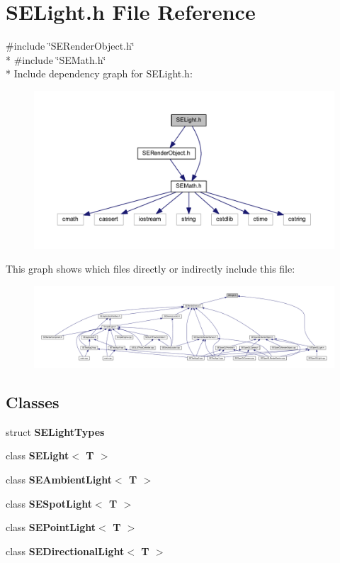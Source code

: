 \section{S\+E\+Light.\+h File Reference}
\label{_s_e_light_8h}
{\ttfamily \#include \char`\"{}S\+E\+Render\+Object.\+h\char`\"{}}\\*
{\ttfamily \#include \char`\"{}S\+E\+Math.\+h\char`\"{}}\\*
Include dependency graph for S\+E\+Light.\+h\+:
\nopagebreak
\begin{figure}[H]
\begin{center}
\leavevmode
\includegraphics[width=350pt]{_s_e_light_8h__incl}
\end{center}
\end{figure}
This graph shows which files directly or indirectly include this file\+:
\nopagebreak
\begin{figure}[H]
\begin{center}
\leavevmode
\includegraphics[width=350pt]{_s_e_light_8h__dep__incl}
\end{center}
\end{figure}
\subsection*{Classes}
\begin{DoxyCompactItemize}
\item 
struct {\bf S\+E\+Light\+Types}
\item 
class {\bf S\+E\+Light$<$ T $>$}
\item 
class {\bf S\+E\+Ambient\+Light$<$ T $>$}
\item 
class {\bf S\+E\+Spot\+Light$<$ T $>$}
\item 
class {\bf S\+E\+Point\+Light$<$ T $>$}
\item 
class {\bf S\+E\+Directional\+Light$<$ T $>$}
\end{DoxyCompactItemize}
